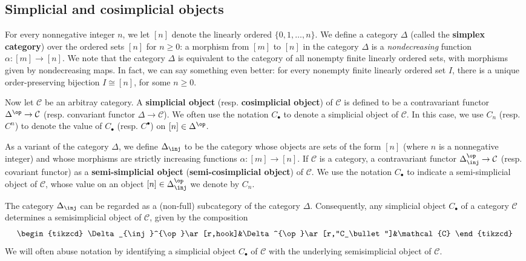 \subsection{Simplicial and cosimplicial objects}
For every nonnegative integer $n$, we let $[n]$ denote the linearly ordered $\{0,1,\dots,n\}$. We define a category $\Delta$ (called the \textbf{simplex category}) over the ordered sets $[n]$ for $n\geq 0$: a morphism from $[m]$ to $[n]$ in the category $\Delta$ is a \textit{nondecreasing} function $\alpha:[m]\to[n]$. We note that the category $\Delta$ is equivalent to the category of all nonempty finite linearly ordered sets, with morphisms given by nondecreasing maps. In fact, we can say something even better: for every nonempty finite linearly ordered set $I$, there is a unique order-preserving bijection $I\cong[n]$, for some $n\geq 0$.\par
Now let $\mathcal{C}$ be an arbitray category. A \textbf{simplicial object} (resp. \textbf{cosimplicial object}) of $\mathcal{C}$ is defined to be a contravariant functor $\Delta^{\op}\to\mathcal{C}$ (resp. convariant functor $\Delta\to\mathcal{C}$). We often use the notation $C_\bullet$ to denote a simplicial object of $\mathcal{C}$. In this case, we use $C_n$ (resp. $C^n$) to denote the value of $C_\bullet$ (resp. $C^\bullet$) on $[n]\in\Delta^{\op}$.\par
As a variant of the category $\Delta$, we define $\Delta_{\inj}$ to be the category whose objects are sets of the form $[n]$ (where $n$ is a nonnegative integer) and whose morphisms are strictly increasing functions $\alpha:[m]\to[n]$. If $\mathcal{C}$ is a category, a contravariant functor $\Delta_{\inj}^{\op}\to\mathcal{C}$ (resp. covariant functor) as a \textbf{semi-simplicial object} (\textbf{semi-cosimplicial object}) of $\mathcal{C}$. We use the notation $C_\bullet$ to indicate a semi-simplicial object of $\mathcal{C}$, whose value on an object $[n]\in\Delta^{\op}_{\inj}$ we denote by $C_n$.
\begin{remark}
The category $\Delta_{\inj}$ can be regarded as a (non-full) subcategory of the category $\Delta$. Consequently, any simplicial object $C_\bullet$ of a category $\mathcal{C}$ determines a semisimplicial object of $\mathcal{C}$, given by the composition
\[\begin{tikzcd}
\Delta_{\inj}^{\op}\ar[r,hook]&\Delta^{\op}\ar[r,"C_\bullet"]&\mathcal{C}
\end{tikzcd}
\]
We will often abuse notation by identifying a simplicial object $C_\bullet$ of $\mathcal{C}$ with the underlying semisimplicial object of $\mathcal{C}$.
\end{remark}
